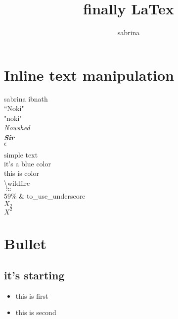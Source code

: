 \documentclass[]{article}
\author{sabrina}
\title{finally LaTex}
\begin{document}
\section{Inline text manipulation}

\maketitle
sabrina ibnath\\
``Noki"\\%
"noki"\\%
\emph{Nowshed}\\%
\textbf{\textit{Sir}}\\%
$ \epsilon $%


$\mbox{simple text}$\\%

{\color{blue}it's a blue color}\\%

{\color[HTML]{653328} this is  color}\\
\textbackslash{wildfire}\\
$\approx$\\
59\% \& to\_use\_underscore\\

$X_{2}$\\
$X^{2}$\\

\section{Bullet}
\label{red:itemize}
\subsection{it's starting}
\begin{itemize}
\item this is first
\item this is second
\end{itemize}
\end{document}
